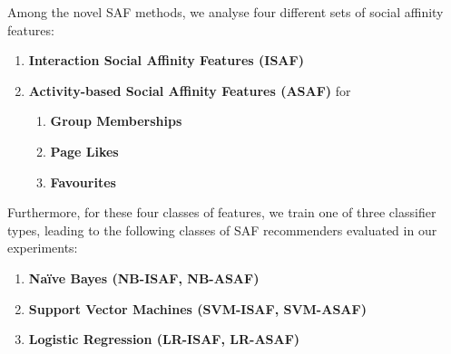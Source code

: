 

Among the novel SAF methods, we analyse four different sets of 
social affinity features:
\begin{enumerate}
\item {\bf Interaction Social Affinity Features (ISAF)}
\item {\bf Activity-based Social Affinity Features (ASAF)} for 
  \begin{enumerate}
  \item {\bf Group Memberships}
  \item {\bf Page Likes}
  \item {\bf Favourites}
  \end{enumerate}
\end{enumerate}
Furthermore, for these four classes of features, we train
one of three classifier types, leading to the following
classes of SAF recommenders evaluated in our experiments:
\begin{enumerate}
  \item {\bf Na\"{i}ve Bayes (NB-ISAF, NB-ASAF)}
  \item {\bf Support Vector Machines (SVM-ISAF, SVM-ASAF)}
  \item {\bf Logistic Regression (LR-ISAF, LR-ASAF)}
\end{enumerate}

